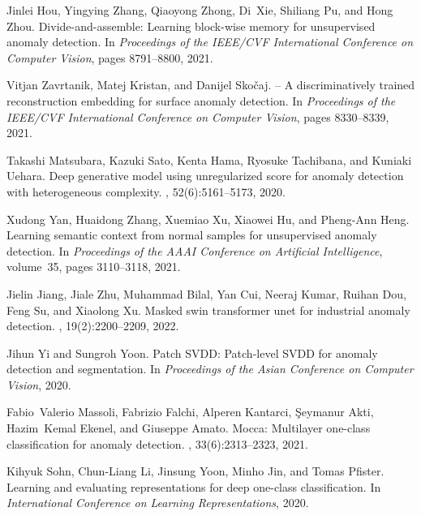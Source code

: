{\begin{thebibliography}{10}
Jinlei Hou, Yingying Zhang, Qiaoyong Zhong, Di~Xie, Shiliang Pu, and Hong Zhou.
\newblock Divide-and-assemble: Learning block-wise memory for unsupervised
  anomaly detection.
\newblock In {\em Proceedings of the IEEE/CVF International Conference on
  Computer Vision}, pages 8791--8800, 2021.

Vitjan Zavrtanik, Matej Kristan, and Danijel Sko{\v{c}}aj.
 -- {A} discriminatively trained reconstruction embedding for
  surface anomaly detection.
\newblock In {\em Proceedings of the IEEE/CVF International Conference on
  Computer Vision}, pages 8330--8339, 2021.

Takashi Matsubara, Kazuki Sato, Kenta Hama, Ryosuke Tachibana, and Kuniaki
  Uehara.
\newblock Deep generative model using unregularized score for anomaly detection
  with heterogeneous complexity.
, 52(6):5161--5173, 2020.

Xudong Yan, Huaidong Zhang, Xuemiao Xu, Xiaowei Hu, and Pheng-Ann Heng.
\newblock Learning semantic context from normal samples for unsupervised
  anomaly detection.
\newblock In {\em Proceedings of the AAAI Conference on Artificial
  Intelligence}, volume~35, pages 3110--3118, 2021.

Jielin Jiang, Jiale Zhu, Muhammad Bilal, Yan Cui, Neeraj Kumar, Ruihan Dou,
  Feng Su, and Xiaolong Xu.
\newblock Masked swin transformer unet for industrial anomaly detection.
, 19(2):2200--2209,
  2022.

Jihun Yi and Sungroh Yoon.
\newblock Patch {SVDD}: Patch-level {SVDD} for anomaly detection and
  segmentation.
\newblock In {\em Proceedings of the Asian Conference on Computer Vision},
  2020.

Fabio~Valerio Massoli, Fabrizio Falchi, Alperen Kantarci, {\c{S}}eymanur Akti,
  Hazim~Kemal Ekenel, and Giuseppe Amato.
\newblock Mocca: Multilayer one-class classification for anomaly detection.
,
  33(6):2313--2323, 2021.

Kihyuk Sohn, Chun-Liang Li, Jinsung Yoon, Minho Jin, and Tomas Pfister.
\newblock Learning and evaluating representations for deep one-class
  classification.
\newblock In {\em International Conference on Learning Representations}, 2020.


\end{thebibliography}}
